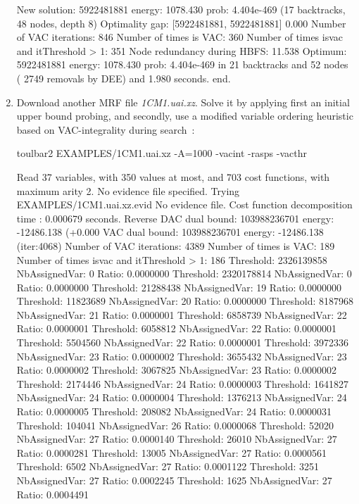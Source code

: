 \begin{enumerate}
{\begin{DoxyCode}
New solution: 5922481881 energy: 1078.430 prob: 4.404e-469 (17 backtracks, 48 nodes, depth 8)
Optimality gap: [5922481881, 5922481881] 0.000 %
Number of VAC iterations: 846
Number of times is VAC: 360 Number of times isvac and itThreshold > 1: 351
Node redundancy during HBFS: 11.538 %
Optimum: 5922481881 energy: 1078.430 prob: 4.404e-469 in 21 backtracks and 52 nodes ( 2749 removals by DEE) and 1.980 seconds.
end.
\end{DoxyCode}}
\item Download another MRF file {\em 1CM1.uai.xz}. Solve it by applying first an initial upper bound probing, and secondly, use a modified variable ordering heuristic based on VAC-integrality during search~\cite{Trosser20a}:
\begin{DoxyCode}
	toulbar2 EXAMPLES/1CM1.uai.xz -A=1000 -vacint -rasps -vacthr
\end{DoxyCode}
{\scriptsize
\begin{DoxyCode}
Read 37 variables, with 350 values at most, and 703 cost functions, with maximum arity 2.
No evidence file specified. Trying EXAMPLES/1CM1.uai.xz.evid
No evidence file. 
Cost function decomposition time : 0.000679 seconds.
Reverse DAC dual bound: 103988236701 energy: -12486.138 (+0.000%
VAC dual bound: 103988236701 energy: -12486.138 (iter:4068)
Number of VAC iterations: 4389
Number of times is VAC: 189 Number of times isvac and itThreshold > 1: 186
Threshold: 2326139858 NbAssignedVar: 0 Ratio: 0.0000000
Threshold: 2320178814 NbAssignedVar: 0 Ratio: 0.0000000
Threshold: 21288438 NbAssignedVar: 19 Ratio: 0.0000000
Threshold: 11823689 NbAssignedVar: 20 Ratio: 0.0000000
Threshold: 8187968 NbAssignedVar: 21 Ratio: 0.0000001
Threshold: 6858739 NbAssignedVar: 22 Ratio: 0.0000001
Threshold: 6058812 NbAssignedVar: 22 Ratio: 0.0000001
Threshold: 5504560 NbAssignedVar: 22 Ratio: 0.0000001
Threshold: 3972336 NbAssignedVar: 23 Ratio: 0.0000002
Threshold: 3655432 NbAssignedVar: 23 Ratio: 0.0000002
Threshold: 3067825 NbAssignedVar: 23 Ratio: 0.0000002
Threshold: 2174446 NbAssignedVar: 24 Ratio: 0.0000003
Threshold: 1641827 NbAssignedVar: 24 Ratio: 0.0000004
Threshold: 1376213 NbAssignedVar: 24 Ratio: 0.0000005
Threshold: 208082 NbAssignedVar: 24 Ratio: 0.0000031
Threshold: 104041 NbAssignedVar: 26 Ratio: 0.0000068
Threshold: 52020 NbAssignedVar: 27 Ratio: 0.0000140
Threshold: 26010 NbAssignedVar: 27 Ratio: 0.0000281
Threshold: 13005 NbAssignedVar: 27 Ratio: 0.0000561
Threshold: 6502 NbAssignedVar: 27 Ratio: 0.0001122
Threshold: 3251 NbAssignedVar: 27 Ratio: 0.0002245
Threshold: 1625 NbAssignedVar: 27 Ratio: 0.0004491

\end{DoxyCode}}
\end{enumerate}
